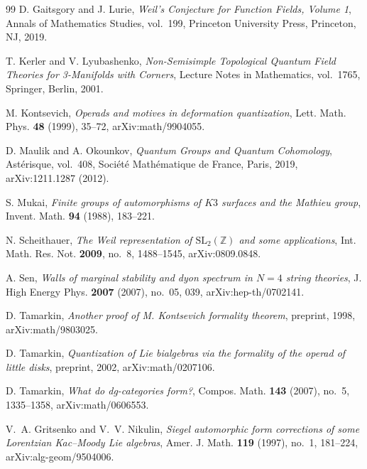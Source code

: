 \begin{thebibliography}{99}
D. Gaitsgory and J. Lurie, \emph{Weil's Conjecture for Function Fields, Volume 1}, Annals of Mathematics Studies, vol.~199, Princeton University Press, Princeton, NJ, 2019.

T. Kerler and V. Lyubashenko, \emph{Non-Semisimple Topological Quantum Field Theories for 3-Manifolds with Corners}, Lecture Notes in Mathematics, vol.~1765, Springer, Berlin, 2001.

M. Kontsevich, \emph{Operads and motives in deformation quantization}, Lett. Math. Phys. \textbf{48} (1999), 35--72, arXiv:math/9904055.

D. Maulik and A. Okounkov, \emph{Quantum Groups and Quantum Cohomology}, Ast\'erisque, vol.~408, Soci\'et\'e Math\'ematique de France, Paris, 2019, arXiv:1211.1287 (2012).

S. Mukai, \emph{Finite groups of automorphisms of $K3$ surfaces and the Mathieu group}, Invent. Math. \textbf{94} (1988), 183--221.

N. Scheithauer, \emph{The Weil representation of $\mathrm{SL}_2(\mathbb{Z})$ and some applications}, Int. Math. Res. Not. \textbf{2009}, no.~8, 1488--1545, arXiv:0809.0848.

A. Sen, \emph{Walls of marginal stability and dyon spectrum in $N=4$ string theories}, J. High Energy Phys. \textbf{2007} (2007), no.~05, 039, arXiv:hep-th/0702141.

D. Tamarkin, \emph{Another proof of M. Kontsevich formality theorem}, preprint, 1998, arXiv:math/9803025.

D. Tamarkin, \emph{Quantization of Lie bialgebras via the formality of the operad of little disks}, preprint, 2002, arXiv:math/0207106.

D. Tamarkin, \emph{What do dg-categories form?}, Compos. Math. \textbf{143} (2007), no.~5, 1335--1358, arXiv:math/0606553.

V.~A. Gritsenko and V.~V. Nikulin, \emph{Siegel automorphic form corrections of some Lorentzian Kac--Moody Lie algebras}, Amer. J. Math. \textbf{119} (1997), no.~1, 181--224, arXiv:alg-geom/9504006.


\end{thebibliography}
